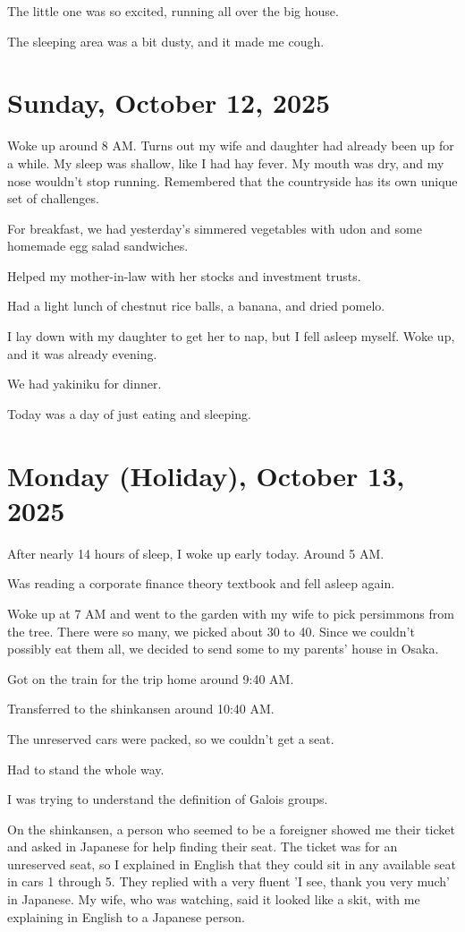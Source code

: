 \documentclass[uplatex]{jsarticle}
\begin{document}
The little one was so excited, running all over the big house.

The sleeping area was a bit dusty, and it made me cough.



\section{Sunday, October 12, 2025}

Woke up around 8 AM.
Turns out my wife and daughter had already been up for a while.
My sleep was shallow, like I had hay fever.
My mouth was dry, and my nose wouldn't stop running.
Remembered that the countryside has its own unique set of challenges.

For breakfast, we had yesterday's simmered vegetables with udon and some homemade egg salad sandwiches.

Helped my mother-in-law with her stocks and investment trusts.

Had a light lunch of chestnut rice balls, a banana, and dried pomelo.

I lay down with my daughter to get her to nap, but I fell asleep myself. Woke up, and it was already evening.

We had yakiniku for dinner.

Today was a day of just eating and sleeping.


\section{Monday (Holiday), October 13, 2025}

After nearly 14 hours of sleep, I woke up early today. Around 5 AM.

Was reading a corporate finance theory textbook and fell asleep again.

Woke up at 7 AM and went to the garden with my wife to pick persimmons from the tree.
There were so many, we picked about 30 to 40.
Since we couldn't possibly eat them all, we decided to send some to my parents' house in Osaka.

Got on the train for the trip home around 9:40 AM.

Transferred to the shinkansen around 10:40 AM.

The unreserved cars were packed, so we couldn't get a seat.

Had to stand the whole way.

I was trying to understand the definition of Galois groups.

On the shinkansen, a person who seemed to be a foreigner showed me their ticket and asked in Japanese for help finding their seat.
The ticket was for an unreserved seat, so I explained in English that they could sit in any available seat in cars 1 through 5.
They replied with a very fluent 'I see, thank you very much' in Japanese.
My wife, who was watching, said it looked like a skit, with me explaining in English to a Japanese person.
\end{document}
